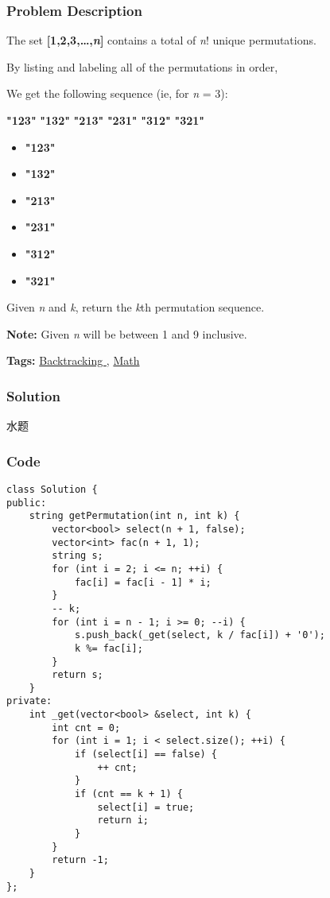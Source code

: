 \documentclass{article}
\begin{document}
\begin{CJK*}{UTF8}{gkai}
\subsubsection*{Problem Description}
The set \textbf{[1,2,3,…,\emph{n}]} contains a total of \emph{n}! unique permutations.

By listing and labeling all of the permutations in order,


We get the following sequence (ie, for \emph{n} = 3):

\textbf{"123"}
\textbf{"132"}
\textbf{"213"}
\textbf{"231"}
\textbf{"312"}
\textbf{"321"}

\begin{itemize}
\item \textbf{"123"}
\item \textbf{"132"}
\item \textbf{"213"}
\item \textbf{"231"}
\item \textbf{"312"}
\item \textbf{"321"}
\end{itemize}

Given \emph{n} and \emph{k}, return the \emph{k}th permutation sequence.

\textbf{Note:} Given \emph{n} will be between 1 and 9 inclusive.


\textbf{Tags: }
\hyperref[ Backtracking ]{ Backtracking },  \hyperref[ Math ]{ Math }



\subsubsection*{Solution}
水题

\subsubsection*{Code}
\begin{lstlisting}
class Solution {
public:
    string getPermutation(int n, int k) {
        vector<bool> select(n + 1, false);
        vector<int> fac(n + 1, 1);
        string s;
        for (int i = 2; i <= n; ++i) {
            fac[i] = fac[i - 1] * i;
        }
        -- k;
        for (int i = n - 1; i >= 0; --i) {
            s.push_back(_get(select, k / fac[i]) + '0');
            k %= fac[i];
        }
        return s;
    }
private:
    int _get(vector<bool> &select, int k) {
        int cnt = 0;
        for (int i = 1; i < select.size(); ++i) {
            if (select[i] == false) {
                ++ cnt;
            }
            if (cnt == k + 1) {
                select[i] = true;
                return i;
            }
        }
        return -1;
    }
};


\end{lstlisting}
\end{CJK*}
\end{document}
